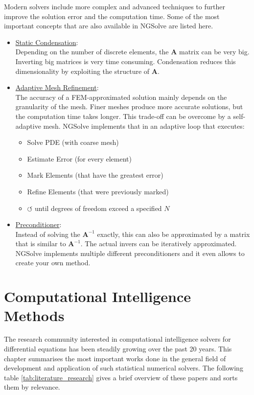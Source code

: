 \documentclass[./\jobname.tex]{subfiles}
\begin{document}
Modern solvers include more complex and advanced techniques to further improve the solution error and the computation time. Some of the most important concepts that are also available in NGSolve are listed here. 

\begin{itemize}
	\item \underline{Static Condensation}: \\
		  Depending on the number of discrete elements, the $\mathbf{A}$ matrix can be very big. Inverting big matrices is very time consuming. Condensation reduces this dimensionality by exploiting the structure of $\mathbf{A}$. 
	\item \underline{Adaptive Mesh Refinement}: \\
		  The accuracy of a FEM-approximated solution mainly depends on the granularity of the mesh. Finer meshes produce more accurate solutions, but the computation time takes longer. This trade-off can be overcome by a self-adaptive mesh. NGSolve implements that in an adaptive loop that executes: 
		  \begin{itemize}
		  	\item Solve PDE (with coarse mesh)
		  	\item Estimate Error (for every element)
		  	\item Mark Elements (that have the greatest error)
		  	\item Refine Elements (that were previously marked)
		  	\item $\mathbf{\circlearrowleft}$  until degrees of freedom exceed a specified $N$
		  \end{itemize}
	\item \underline{Preconditioner}: \\
		  Instead of solving the $\mathbf{A}^{-1}$ exactly, this can also be approximated by a matrix that is similar to $\mathbf{A}^{-1}$. The actual invers can be iteratively approximated. NGSolve implements multiple different preconditioners and it even allows to create your own method. 
\end{itemize}


\section{Computational Intelligence Methods} 
\label{chap:literature_overview}

The research community interested in computational intelligence solvers for differential equations has been steadily growing over the past 20 years. This chapter summarises the most important works done in the general field of development and application of such statistical numerical solvers. The following table \ref{tab:literature_research} gives a brief overview of these papers and sorts them by relevance. 
\end{document}
